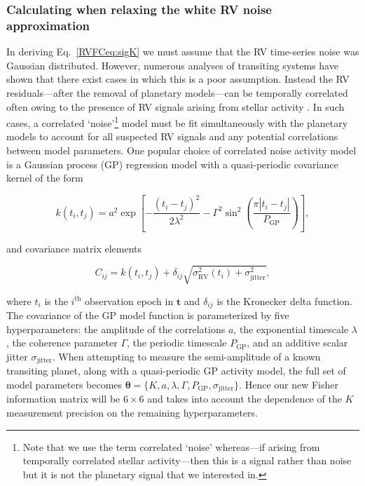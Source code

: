 \subsubsection{Calculating \sigK{} when relaxing the white RV noise approximation} \label{RVFCsect:fisherGP}
In deriving Eq.~\ref{RVFCeq:sigK} we must assume that the RV time-series noise was Gaussian
distributed. However, numerous analyses of transiting systems have shown that there exist cases in which this is
a poor assumption. Instead the RV residuals---after the removal of planetary models---can be temporally correlated
often owing to the presence of RV signals arising from stellar activity
\citep[e.g.][]{haywood14, grunblatt15, lopezmorales16, cloutier17b, dittmann17}. In
such cases, a correlated `noise'\footnote{Note that we use the term correlated `noise' whereas---if arising
  from temporally correlated stellar activity---then this is a signal rather than noise but it is not the planetary
  signal that we interested in.}
model must be fit simultaneously with the planetary models to account for all suspected
RV signals and any potential correlations between model parameters. One popular choice of
correlated noise activity model is a Gaussian process (GP) regression model with a quasi-periodic covariance kernel
of the form

\begin{equation}
  k(t_i,t_j) = a^2 \exp{\left[ -\frac{(t_i-t_j)^2}{2 \lambda^2}
      -\Gamma^2 \sin^2{\left(\frac{\pi |t_i-t_j|}{P_{\text{GP}}} \right)} \right]},
  \label{RVFCeq:kernel}
\end{equation}

\noindent and covariance matrix elements

\begin{equation}
  C_{ij} = k(t_i,t_j) + \delta_{ij} \sqrt{\sigma_{\text{RV}}^2(t_i) + \sigma_{\text{jitter}}^2},
  \label{RVFCeq:cov}
\end{equation}

\noindent where $t_i$ is the $i^{\text{th}}$ observation epoch in $\mathbf{t}$ and
$\delta_{ij}$ is the Kronecker delta function. The covariance of the GP model function is parameterized
by five hyperparameters: the amplitude of the correlations $a$, the exponential timescale $\lambda$,
the coherence parameter $\Gamma$, the periodic timescale $P_{\text{GP}}$, and an additive scalar jitter
$\sigma_{\text{jitter}}$.
When attempting to measure the semi-amplitude of a known transiting planet, along with a quasi-periodic GP
activity model, the full set of model parameters becomes
$\boldsymbol{\theta} = \{K, a, \lambda, \Gamma, P_{\text{GP}}, \sigma_{\text{jitter}} \}$. Hence our new Fisher
information matrix will be $6 \times 6$ and takes into account the dependence of the $K$
measurement precision on the remaining hyperparameters. \\

